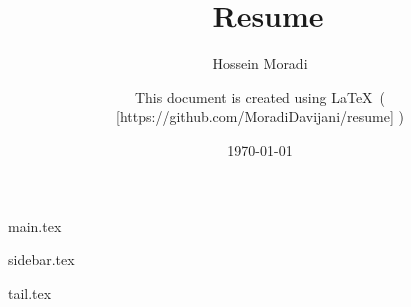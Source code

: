 \documentclass[10pt,a4paper]{resume}
\author{Hossein Moradi}
\date{\today}
\title{\@author\ Resume}
\begin{document}

  \begin{paracol}{2}

    \begin{leftcolumn}
      \makecvheader\bigskip
    \end{leftcolumn}
    \begin{rightcolumn}
    \end{rightcolumn}

    \begin{leftcolumn*}
      {main.tex}
    \end{leftcolumn*}

    \begin{rightcolumn}
      {sidebar.tex}
      \signature{%
        This document is created using \LaTeX \ (%
          [https://github.com/MoradiDavijani/resume]%
        )%
      }
    \end{rightcolumn}

  \end{paracol}

  \newpage
  {tail.tex}
\end{document}
